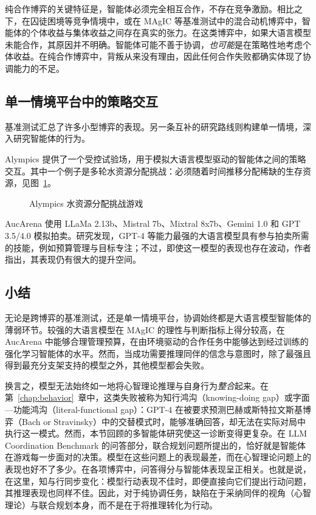 纯合作博弈的关键特征是，智能体必须完全相互合作，不存在竞争激励。相比之下，在囚徒困境等竞争情境中，或在 MAgIC 等基准测试中的混合动机博弈中，智能体的个体收益与集体收益之间存在真实的张力。在这类博弈中，如果大语言模型未能合作，其原因并不明确。智能体可能不善于协调，\textit{也可能}是在策略性地考虑个体收益。在纯合作博弈中，背叛从来没有理由，因此任何合作失败都确实体现了协调能力的不足。

\subsection{单一情境平台中的策略交互}
基准测试汇总了许多小型博弈的表现。另一条互补的研究路线则构建单一情境，深入研究智能体的行为。

Alympics \citep{mao2023alympics} 提供了一个受控试验场，用于模拟大语言模型驱动的智能体之间的策略交互。其中一个例子是多轮水资源分配挑战：必须随着时间推移分配稀缺的生存资源，见图~\ref{fig:water}。
\begin{figure}
  \begin{center}
    
    \caption{Alympics 水资源分配挑战游戏 \citep{mao2023alympics}}\label{fig:water}
  \end{center}
\end{figure}

AucArena \citep{chen2023put} 使用 LLaMa 2.13b、Mistral 7b、Mixtral 8x7b、Gemini 1.0 和 GPT 3.5/4.0 模拟拍卖。研究发现，GPT-4 等能力最强的大语言模型具有参与拍卖所需的技能，例如预算管理与目标专注；不过，即使这一模型的表现也存在波动，作者指出，其表现仍有很大的提升空间。

\subsection{小结}
无论是跨博弈的基准测试，还是单一情境平台，协调始终都是大语言模型智能体的薄弱环节。较强的大语言模型在 MAgIC 的理性与判断指标上得分较高，在 AucArena 中能够合理管理预算，在由环境驱动的合作任务中能够达到经过训练的强化学习智能体的水平。然而，当成功需要推理同伴的信念与意图时，除了最强且得到最充分支架支持的模型之外，其他模型都会失败。

换言之，模型无法始终如一地将心智理论推理与自身行为\emph{整合}起来。在第~\ref{chap:behavior}~章中，这类失败被称为知行鸿沟（knowing-doing gap）或字面—功能鸿沟（literal-functional gap）：GPT-4 在被要求预测巴赫或斯特拉文斯基博弈（Bach or Stravinsky）中的交替模式时，能够准确回答，却无法在实际对局中执行这一模式。然而，本节回顾的多智能体研究使这一诊断变得更复杂。在 LLM Coordination Benchmark 的问答部分，联合规划问题所提出的，恰好就是智能体在游戏每一步面对的决策。模型在这些问题上的表现最差，而在心智理论问题上的表现也好不了多少。在各项博弈中，问答得分与智能体表现呈正相关。也就是说，在这里，知与行同步变化：模型行动表现不佳时，即便直接向它们提出行动问题，其推理表现也同样不佳。因此，对于纯协调任务，缺陷在于采纳同伴的视角（心智理论）与联合规划本身，而不是在于将推理转化为行动。

